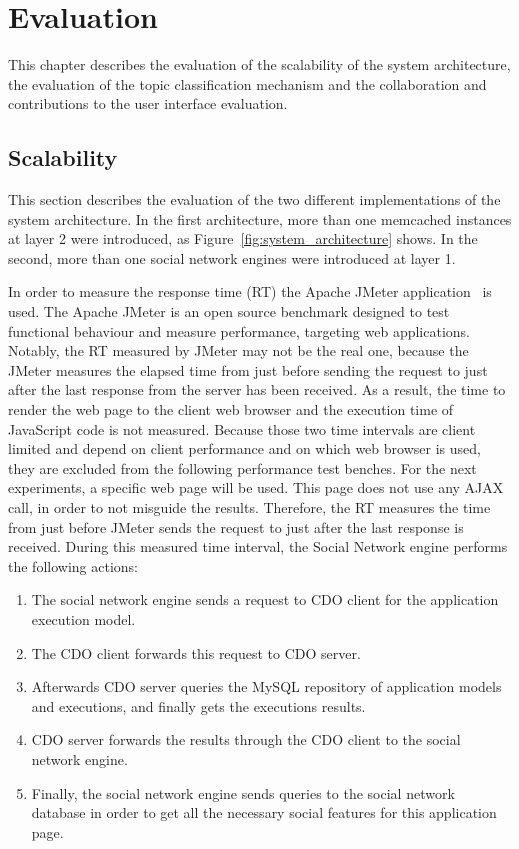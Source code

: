 \chapter{Evaluation}
\label{chapt:evaluation}
This chapter describes the evaluation of the scalability of the system architecture, the evaluation of the topic classification mechanism and the collaboration and contributions to the user interface evaluation.  

\section{Scalability}
\label{sec:eval_scalability}
This section describes the evaluation of the two different implementations of the system architecture. In the first architecture, more than one memcached instances at layer 2 were introduced, as Figure~\ref{fig:system_architecture} shows. In the second, more than one social network engines were introduced at layer 1.

In order to measure the response time (RT) the Apache JMeter application~\cite{jmeter_url} is used. The Apache JMeter is an open source benchmark designed to test functional behaviour and  measure performance, targeting web applications. Notably, the RT measured by JMeter may not be the real one, because the JMeter measures the elapsed time from just before sending the request to just after the last response from the server has been received. As a result, the time to render the web page to the client web browser and the execution time of JavaScript code is not measured. Because those two time intervals are client limited and depend on client performance and on which web browser is used, they are excluded from the following performance test benches. For the next experiments, a specific web page will be used. This page does not use any AJAX call, in order to not misguide the results. Therefore, the RT measures the time from just before JMeter sends the request to just after the last response is received. During this measured time interval, the Social Network engine performs the following actions:
\begin{enumerate}[I]
\item The social network engine sends a request to CDO client for the application execution model.
\item The CDO client forwards this request to CDO server.
\item Afterwards CDO server queries the MySQL repository of application models and executions, and finally gets the executions results.
\item CDO server forwards the results through the CDO client to the social network engine.
\item Finally, the social network engine sends queries to the social network database in order to get all the necessary social features for this application page.
\end{enumerate}

